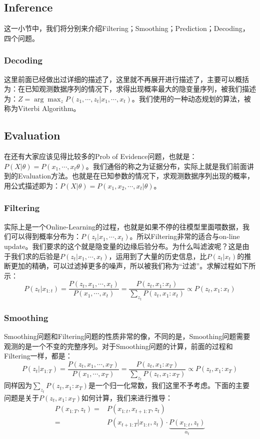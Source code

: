 \documentclass[a4paper]{article}
\begin{document}
\subsection{Inference}
这一小节中，我们将分别来介绍Filtering；Smoothing；Prediction；Decoding，四个问题。

\subsubsection{Decoding}
这里前面已经做出过详细的描述了，这里就不再展开进行描述了，主要可以概括为：在已知观测数据序列的情况下，求得出现概率最大的隐变量序列，被我们描述为：$Z = \arg\max_z P(z_1,\cdots,z_t|x_1,\cdots,x_t)$。我们使用的一种动态规划的算法，被称为Viterbi Algorithm。

\subsection{Evaluation}
在还有大家应该见得比较多的Prob of Evidence问题，也就是：$P(X|\theta) = P(x_1,\cdots,x_t
\theta)$。我们通俗的称之为证据分布，实际上就是我们前面讲到的Evaluation方法。也就是在已知参数的情况下，求观测数据序列出现的概率，用公式描述即为：$P(X|\theta) = P(x_1,x_2,\cdots,x_t|\theta)$。

\subsubsection{Filtering}
实际上是一个Online-Learning的过程，也就是如果不停的往模型里面喂数据，我们可以得到概率分布为：$P(z_t|x_1,\cdots,x_t)$。所以Filtering非常的适合与on-line update。我们要求的这个就是隐变量的边缘后验分布。为什么叫滤波呢？这是由于我们求的后验是$P(z_t|x_1,\cdots,x_t)$，运用到了大量的历史信息，比$P(z_t|x_t)$的推断更加的精确，可以过滤掉更多的噪声，所以被我们称为“过滤”。求解过程如下所示：
\begin{equation}
    P(z_t|x_{1:t}) = \frac{P(z_t,x_1,\cdots,x_t)}{P(x_1,\cdots,x_t)} = \frac{P(z_t,x_1:x_t)}{\sum_{z_t} P(z_t,x_1:x_t)} \propto P(z_t,x_1:x_t)
\end{equation}

\subsubsection{Smoothing}
Smoothing问题和Filtering问题的性质非常的像，不同的是，Smoothing问题需要观测的是一个不变的完整序列。对于Smoothing问题的计算，前面的过程和Filtering一样，都是：
\begin{equation}
    P(z_t|x_{1:T}) = \frac{P(z_t,x_1,\cdots,x_T)}{P(x_1,\cdots,x_T)} = \frac{P(z_t,x_1:x_T)}{\sum_{z_t} P(z_t,x_1:x_T)} \propto P(z_t,x_1:x_T)
\end{equation}
同样因为$\sum_{z_t} P(z_t,x_1:x_T)$是一个归一化常数，我们这里不予考虑。下面的主要问题是关于$P(z_t,x_1:x_T)$如何计算，我们来进行推导：
\begin{equation}
    \begin{split}
        P(x_{1:T},z_t) = & P(x_{1:t},x_{t+1:T},z_t) \\
        = & P(x_{t+1:T}|x_{1:t},z_t) \cdot \underbrace{P(x_{1:t},z_t)}_{\alpha_t}
    \end{split}
\end{equation}
\end{document}

